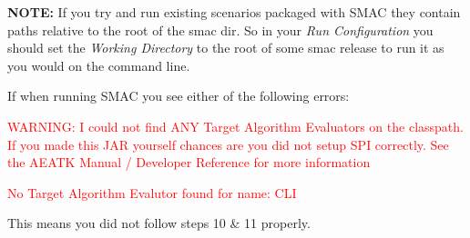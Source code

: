 \documentclass[manual.tex]{subfiles}
\begin{document}
\textbf{NOTE:} If you try and run existing scenarios packaged with SMAC they contain paths relative to the root of the smac dir. So in your \emph{Run Configuration} you should set the \emph{Working Directory} to the root of some smac release to run it as you would on the command line.


If when running SMAC you see either of the following errors:

\textcolor{red}{WARNING: I could not find ANY Target Algorithm Evaluators on the classpath. If you made this JAR yourself chances are you did not setup SPI correctly. See the AEATK Manual / Developer Reference for more information}

\textcolor{red}{No Target Algorithm Evalutor found for name: CLI}

\vspace{10pt}

This means you did not follow steps 10 \& 11 properly.
\end{document}
